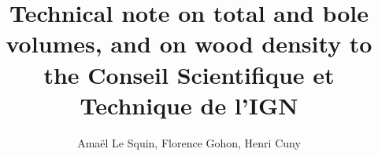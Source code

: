 \documentclass[oneside]{caesar_book}
\title{Technical note on total and bole volumes, and on wood density to the Conseil Scientifique et Technique de l'IGN}
\author{Amaël Le Squin, Florence Gohon, Henri Cuny}
\begin{document}
\frontmatter
\maketitlepage
\tableofcontents
\mainmatter








\printbibliography
\end{document}
